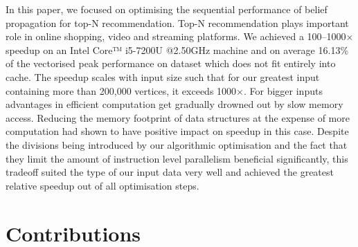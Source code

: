 \documentclass[final,letterpaper]{article}
\begin{document}
In this paper, we focused on optimising the sequential performance of belief propagation for top-N recommendation.
Top-N recommendation plays important role in online shopping, video and streaming platforms. 
We achieved a 100--1000$\times$ speedup on an Intel\circledR{} Core™ i5-7200U @2.50GHz machine and on average 16.13\% of the vectorised peak performance on dataset which does not fit entirely into cache.
The speedup scales with input size such that for our greatest input containing more than 200,000 vertices, it exceeds 1000$\times$.
For bigger inputs advantages in efficient computation get gradually drowned out by slow memory access.
Reducing the memory footprint of data structures at the expense of more computation had shown to have positive impact on speedup in this case.
Despite the divisions being introduced by our algorithmic optimisation and the fact that they limit the amount of instruction level parallelism beneficial significantly, this tradeoff suited the type of our input data very well and achieved the greatest relative speedup out of all optimisation steps.\sr{*}


\section{Contributions}%


\end{document}
